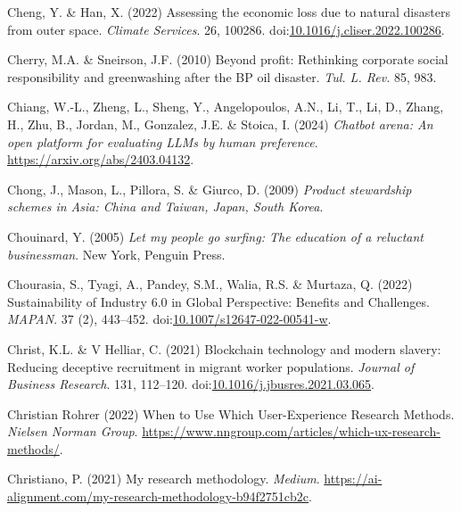 \documentclass[
  letterpaper,
  DIV=11,
  numbers=noendperiod]{scrartcl}
\newlength{\cslhangindent}
\newenvironment{CSLReferences}[2] %
 {\begin{list}{}{%
  \setlength{\itemindent}{0pt}
  \setlength{\leftmargin}{0pt}
  \setlength{\parsep}{0pt}
  \ifodd #1
   \setlength{\leftmargin}{\cslhangindent}
   \setlength{\itemindent}{-1\cslhangindent}
  \fi
  \setlength{\itemsep}{#2\baselineskip}}}
 {\end{list}}
\begin{document}
\begin{CSLReferences}{0}{1}
Cheng, Y. \& Han, X. (2022) Assessing the economic loss due to natural
disasters from outer space. \emph{Climate Services}. 26, 100286.
doi:\href{https://doi.org/10.1016/j.cliser.2022.100286}{10.1016/j.cliser.2022.100286}.

Cherry, M.A. \& Sneirson, J.F. (2010) Beyond profit: {Rethinking}
corporate social responsibility and greenwashing after the {BP} oil
disaster. \emph{Tul. L. Rev.} 85, 983.

Chiang, W.-L., Zheng, L., Sheng, Y., Angelopoulos, A.N., Li, T., Li, D.,
Zhang, H., Zhu, B., Jordan, M., Gonzalez, J.E. \& Stoica, I. (2024)
\emph{Chatbot arena: {An} open platform for evaluating {LLMs} by human
preference}. \url{https://arxiv.org/abs/2403.04132}.

Chong, J., Mason, L., Pillora, S. \& Giurco, D. (2009) \emph{Product
stewardship schemes in {Asia}: {China} and {Taiwan}, {Japan}, {South
Korea}}.

Chouinard, Y. (2005) \emph{Let my people go surfing: The education of a
reluctant businessman}. New York, Penguin Press.

Chourasia, S., Tyagi, A., Pandey, S.M., Walia, R.S. \& Murtaza, Q.
(2022) Sustainability of {Industry} 6.0 in {Global Perspective}:
{Benefits} and {Challenges}. \emph{MAPAN}. 37 (2), 443--452.
doi:\href{https://doi.org/10.1007/s12647-022-00541-w}{10.1007/s12647-022-00541-w}.

Christ, K.L. \& V Helliar, C. (2021) Blockchain technology and modern
slavery: {Reducing} deceptive recruitment in migrant worker populations.
\emph{Journal of Business Research}. 131, 112--120.
doi:\href{https://doi.org/10.1016/j.jbusres.2021.03.065}{10.1016/j.jbusres.2021.03.065}.

Christian Rohrer (2022) When to {Use Which User-Experience Research
Methods}. \emph{Nielsen Norman Group}.
\url{https://www.nngroup.com/articles/which-ux-research-methods/}.

Christiano, P. (2021) My research methodology. \emph{Medium}.
\url{https://ai-alignment.com/my-research-methodology-b94f2751cb2c}.


\end{CSLReferences}
\end{document}
